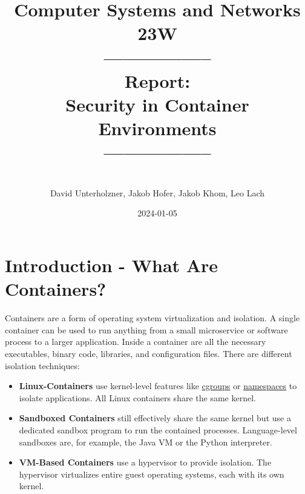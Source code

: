 \documentclass{article}
\begin{document}

\title{
Computer Systems and Networks \\ 23W 
        \vspace{3mm}
         \\ ----------------- \\ Report: \\ Security in Container Environments
         \\ -----------------
}
\date{2024-01-05}
\author{\\David Unterholzner, Jakob Hofer, Jakob Khom, Leo Lach}
\maketitle{}
\bigskip

\renewcommand{\baselinestretch}{0.7}\normalsize
\newpage
\tableofcontents{}
\renewcommand{\baselinestretch}{1.0}\normalsize

\newpage
{}


\section{Introduction - What Are Containers?}
Containers are a form of operating system virtualization and isolation. 
A single container can be used to run anything from a small microservice or software process to a larger application.
Inside a container are all the necessary executables, binary code, libraries, and configuration files.
There are different isolation techniques:
\begin{itemize}
    \item {\bf Linux-Containers} use kernel-level features like \hyperref[sec:ControlGroups]{cgroups} or
        \hyperref[sec:namespaces]{namespaces} to isolate applications. All Linux containers share the same kernel.
        
    \item {\bf Sandboxed Containers} still effectively share the same kernel but use a dedicated sandbox program
        to run the contained processes. Language-level sandboxes are, for example, the Java VM or the Python interpreter.
    
    \item {\bf VM-Based Containers} use a hypervisor to provide isolation. 
        The hypervisor virtualizes entire guest operating systems, each with its own kernel.
\end{itemize}
\end{document}
